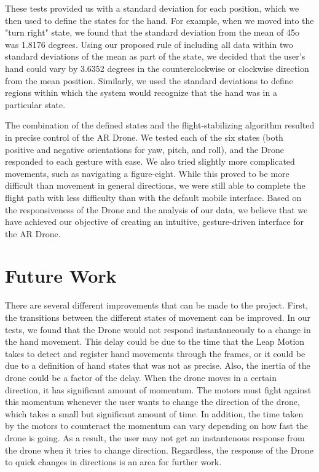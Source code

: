 \documentclass[letterpaper,english, 12pt]{article}
\begin{document}
These tests provided us with a standard deviation for each position, which we then used to define the states for the hand. For example, when we moved into the "turn right" state, we found that the standard deviation from the mean of 45o was 1.8176 degrees. Using our proposed rule of including all data within two standard deviations of the mean as part of the state, we decided that the user's hand could vary by 3.6352 degrees in the counterclockwise or clockwise direction from the mean position. Similarly, we used the standard deviations to define regions within which the system would recognize that the hand was in a particular state.

The combination of the defined states and the flight-stabilizing algorithm resulted in precise control of the AR Drone. We tested each of the six states (both positive and negative orientations for yaw, pitch, and roll), and the Drone responded to each gesture with ease. We also tried slightly more complicated movements, such as navigating a figure-eight. While this proved to be more difficult than movement in general directions, we were still able to complete the flight path with less difficulty than with the default mobile interface. Based on the responsiveness of the Drone and the analysis of our data, we believe that we have achieved our objective of creating an intuitive, gesture-driven interface for the AR Drone.

\section*{Future Work}

There are several different improvements that can be made to the project. First, the transitions between the different states of movement can be improved. In our tests, we found that the Drone would not respond instantaneously to a change in the hand movement. This delay could be due to the time that the Leap Motion takes to detect and register hand movements through the frames, or it could be due to a definition of hand states that was not as precise. Also, the inertia of the drone could be a factor of the delay. When the drone moves in a certain direction, it has significant amount of momentum. The motors must fight against this momentum whenever the user wants to change the direction of the drone, which takes a small but significant amount of time. In addition, the time taken by the motors to counteract the momentum can vary depending on how fast the drone is going. As a result, the user may not get an instantenous response from the drone when it tries to change direction. Regardless, the response of the Drone to quick changes in directions is an area for further work.
	
\end{document}
